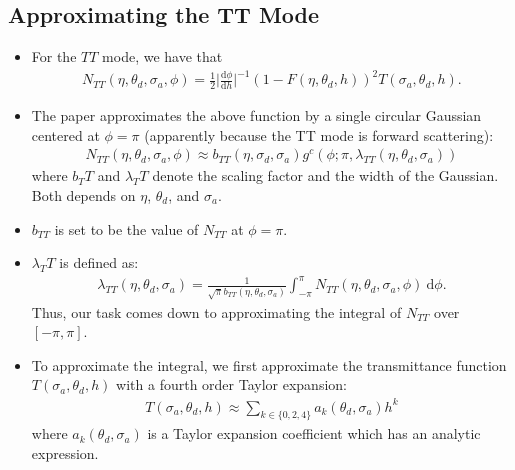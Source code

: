 \documentclass[10pt]{article}
\newcommand{\dee}{\mathrm{d}}
\begin{document}
  \subsection{Approximating the TT Mode}
  \begin{itemize}
    \item For the $TT$ mode, we have that
    \begin{align*}
      N_{TT}(\eta, \theta_d, \sigma_a, \phi) = \frac{1}{2} \bigg| \frac{\dee\phi}{\dee h} \bigg|^{-1} (1 - F(\eta, \theta_d, h))^2 T(\sigma_a, \theta_d, h).
    \end{align*}
    
    \item The paper approximates the above function by a single circular Gaussian centered at $\phi = \pi$ (apparently because the TT mode is forward scattering):
    \begin{align*}
      N_{TT}(\eta, \theta_d, \sigma_a, \phi) \approx b_{TT}(\eta, \sigma_d, \sigma_a) g^c(\phi; \pi, \lambda_{TT}(\eta, \theta_d, \sigma_a))
    \end{align*}
    where $b_TT$ and $\lambda_TT$ denote the scaling factor and the width of the Gaussian. Both depends on $\eta$, $\theta_d$, and $\sigma_a$.
    
    \item $b_{TT}$ is set to be the value of $N_{TT}$ at $\phi = \pi$.
    
    \item $\lambda_TT$ is defined as:
    \begin{align*}
      \lambda_{TT}(\eta, \theta_d, \sigma_a) = \frac{1}{\sqrt{\pi}b_{TT}(\eta, \theta_d, \sigma_a)} \int_{-\pi}^\pi N_{TT}(\eta, \theta_d, \sigma_a, \phi)\ \dee \phi.
    \end{align*}
    Thus, our task comes down to approximating the integral of $N_{TT}$ over $[-\pi, \pi]$.
    
    \item To approximate the integral, we first approximate the transmittance function $T(\sigma_a, \theta_d, h)$ with a fourth order Taylor expansion:
    \begin{align*}
      T(\sigma_a, \theta_d, h) \approx \sum_{k \in \{ 0, 2, 4\}} a_k(\theta_d, \sigma_a) h^k
    \end{align*}
    where $a_k(\theta_d, \sigma_a)$ is a Taylor expansion coefficient which has an analytic expression.
    

\end{itemize}
\end{document}
